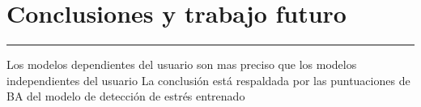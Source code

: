 \chapter{Conclusiones y trabajo futuro}
\hrule \bigskip \vspace*{1cm}








Los modelos dependientes del usuario son mas preciso que los modelos independientes del usuario 
La conclusión está respaldada por las puntuaciones de BA del modelo  de detección de estrés entrenado


